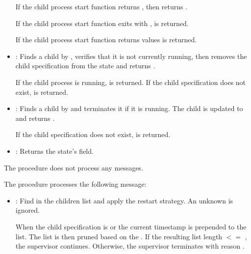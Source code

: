 \begin{itemize}
    If the child process start function returns , then  returns
    .

    If the child process start function exits with ,
     is returned.

    If the child process start function returns  values
     is returned.

  \item{}: Finds a child by
    , verifies that it is not currently running, then
    removes the child specification from the state and returns
    .

    If the child process is running,  is
    returned.  If the child specification does not exist,
     is returned.

  \item{}: Finds a child by
     and terminates it if it is running. The child 
    is updated to  and returns .

    If the child specification does not exist,  is returned.

  \item{}: Returns the state's 
    field.
\end{itemize}

 The  procedure
does not process any messages.

 The  procedure
processes the following message:

\antipar
\begin{itemize}
  \item{}: Find  in
    the children list and apply the restart strategy. An unknown
     is ignored.

    When the child specification  is
     or  the current timestamp is
    prepended to the  list. The list is then pruned
    based on the . If the resulting list length $<=$
    , the supervisor continues. Otherwise, the
    supervisor terminates with reason .
\end{itemize}

